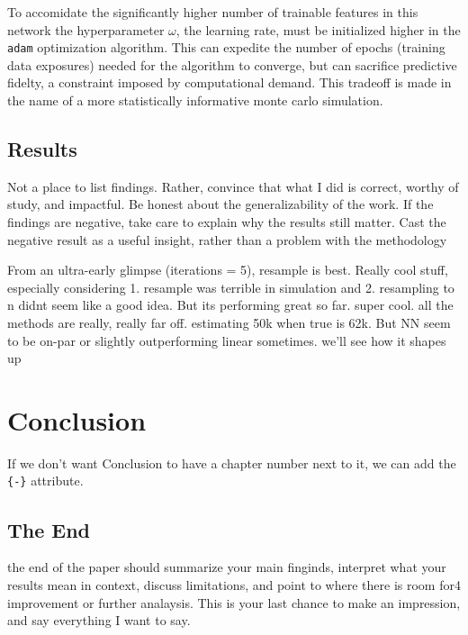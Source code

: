 \documentclass[12pt,twoside]{reedthesis}
\begin{document}
To accomidate the significantly higher number of trainable features in
this network the hyperparameter \(\omega\), the learning rate, must be
initialized higher in the \texttt{adam} optimization algorithm. This can
expedite the number of epochs (training data exposures) needed for the
algorithm to converge, but can sacrifice predictive fidelty, a
constraint imposed by computational demand. This tradeoff is made in the
name of a more statistically informative monte carlo simulation.

\section{Results}\label{results}

Not a place to list findings. Rather, convince that what I did is
correct, worthy of study, and impactful. Be honest about the
generalizability of the work. If the findings are negative, take care to
explain why the results still matter. Cast the negative result as a
useful insight, rather than a problem with the methodology

From an ultra-early glimpse (iterations = 5), resample is best. Really
cool stuff, especially considering 1. resample was terrible in
simulation and 2. resampling to n didnt seem like a good idea. But its
performing great so far. super cool. all the methods are really, really
far off. estimating 50k when true is 62k. But NN seem to be on-par or
slightly outperforming linear sometimes. we'll see how it shapes up

\chapter*{Conclusion}\label{conclusion}

If we don't want Conclusion to have a chapter number next to it, we can
add the \texttt{\{-\}} attribute.

\section{The End}\label{the-end}

the end of the paper should summarize your main finginds, interpret what
your results mean in context, discuss limitations, and point to where
there is room for4 improvement or further analaysis. This is your last
chance to make an impression, and say everything I want to say.
\end{document}
